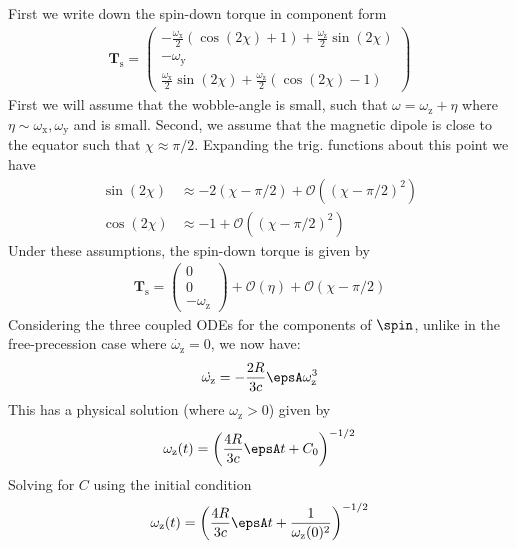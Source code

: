 \documentclass[/home/greg/Thesis/main/main.tex]{subfiles}
\begin{document}
\graphicspath{{/home/greg/Neutron_star_modelling/SpindownRate/img/}}

\newcommand{\spindown}{\dot{\nu}}
\newcommand{\Aem}{\mathcal{A}_{\mathrm{EM}}}
\newcommand{\Tsd}{\boldsymbol{T}_{\mathrm{s}}}
\newcommand{\wx}{\omega_{\mathrm{x}}}
\newcommand{\wy}{\omega_{\mathrm{y}}}
\newcommand{\wz}{\omega_{\mathrm{z}}}

First we write down the spin-down torque in component form
\begin{align}
\Tsd = \left(\begin{array}{c}
-\frac{\wx}{2}\left(\cos(2\chi) + 1\right) + \frac{\wz}{2}\sin(2\chi) \\
-\wy \\
\frac{\wx}{2}\sin(2\chi) + \frac{\wz}{2}\left(\cos(2\chi) - 1\right) 
\end{array}\right)
\end{align}
First we will assume that the wobble-angle is small, such that $\omega = \wz + \eta$
where $\eta \sim \wx, \wy$ and is small. Second, we assume that the magnetic
dipole is close to the equator such that $\chi \approx \pi/2$. Expanding
the trig. functions about this point we have
\begin{align}
\sin(2\chi) &\approx -2\left(\chi - \pi/2\right) + \mathcal{O}\left(\left(\chi - \pi/2\right)^{2}\right) \\
\cos(2\chi) &\approx -1 + \mathcal{O}\left(\left(\chi - \pi/2\right)^{2}\right)
\end{align}
 Under these 
assumptions, the spin-down torque is given by 
\begin{align}
\Tsd = \left(\begin{array}{c}
0 \\
0 \\
-\wz 
\end{array}\right) + \mathcal{O}(\eta) + \mathcal{O}(\chi - \pi/2)
\end{align}
Considering the three coupled ODEs for the components of $\spin$, unlike in the
free-precession case where $\dot{\wz} = 0$, we now have:
\begin{align}
\dot{\wz} = -\frac{2R}{3c} \epsA \wz^{3}
\end{align}
This has a physical solution (where $\wz > 0$) given by 
\begin{align}
\wz(t) = \left(\frac{4R}{3c} \epsA t + C_0 \right)^{-1/2}
\end{align}
Solving for $C$ using the initial condition
\begin{align}
\wz(t) = \left(\frac{4R}{3c} \epsA t + \frac{1}{\wz(0)^{2}}\right)^{-1/2}
\end{align}
\end{document}
